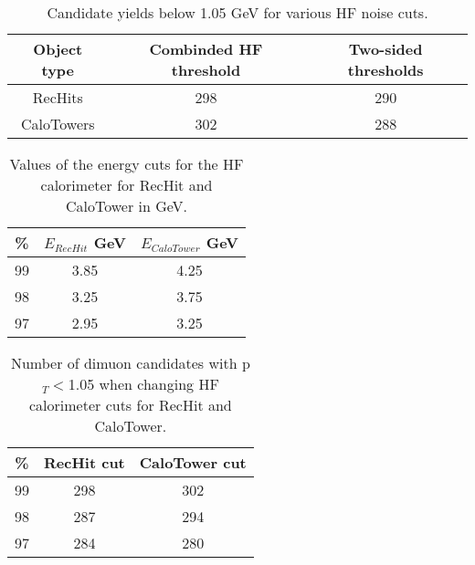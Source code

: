       \begin{table}[!Hhbt]
        \centering
        \begin{tabular}{|c|c|c|}
          \hline
          Object type & Combinded HF threshold & Two-sided thresholds \\ \hline
          RecHits & 298 & 290 \\ \hline
          CaloTowers & 302 & 288 \\ \hline
        \end{tabular}
        \caption{Candidate yields below 1.05 GeV \pt{} for various HF noise
          cuts.}
        \label{tab:hfCutYieldEffects}
      \end{table}

      \begin{table}[!Hhbt]
        \begin{center}
          \caption{Values of the energy cuts for the HF calorimeter for RecHit and CaloTower in GeV.}
          \label{tab:hfAdjustedThresholds}
          \begin{tabular}{|c|c|c|} \hline
            \% &  $E_{RecHit}$ GeV & $E_{CaloTower}$ GeV\\ 
            \hline
            99 & 3.85& 4.25 \\ \hline
            98 & 3.25& 3.75 \\ \hline
            97 & 2.95& 3.25 \\  \hline
           \end{tabular}
         \end{center}
      \end{table}

      \begin{table}[!Hhbt]
        \begin{center}
          \caption{Number of dimuon candidates with  p$_{T} <$1.05 when changing HF calorimeter cuts for RecHit and CaloTower.}
          \label{tab:hfAdjThreshYields}
          \begin{tabular}{|c|c|c|} \hline
            \% &  RecHit cut & CaloTower cut\\ \hline
            99 &   298 & 302 \\ \hline
            98 &  287  & 294 \\ \hline
            97 & 284 & 280 \\ \hline
          \end{tabular}
        \end{center}
      \end{table}

